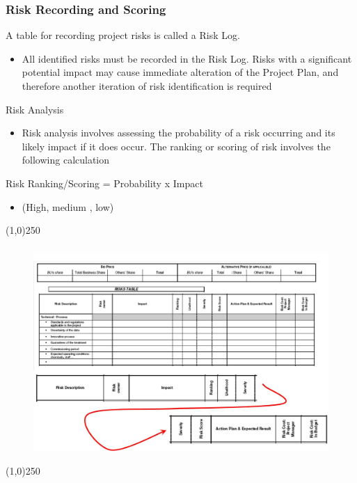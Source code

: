 \begin{frame}
\frametitle{Risk Recording and Scoring}
A table for recording project risks is called a Risk Log. 
		\begin{itemize}
			\item All identified risks must be recorded in the Risk Log. Risks with a significant potential impact may cause immediate alteration of the Project Plan, and therefore another iteration of risk identification is required
		\end{itemize}

Risk Analysis
	\begin{itemize}
		\item Risk analysis involves assessing the probability of a risk occurring and its likely impact if it does occur. The ranking or scoring of risk involves the following calculation
	\end{itemize}
Risk Ranking/Scoring = Probability x Impact
	\begin{itemize}
		\item (High, medium , low)
	\end{itemize}
\end{frame}\begin{center}\line(1,0){250}\end{center}




\begin{frame}
\frametitle{}
\begin{figure}[h]
	\centering
		\includegraphics[width = 10 cm]{images/veo1.jpg}
	\label{fig:veo1}
\end{figure}

\end{frame}\begin{center}\line(1,0){250}\end{center}




